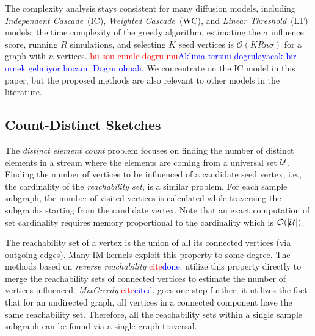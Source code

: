 \documentclass[10pt,journal,compsoc]{IEEEtran}
\newcommand\ggx[1]{\textcolor{blue}{#1}}
\newcommand\kktodo[1]{\textcolor{red}{#1}}
\begin{document}
The complexity analysis stays consistent for many diffusion models, including {\em Independent Cascade}~(IC), {\em Weighted Cascade}~(WC), and {\em Linear Threshold}~(LT)  models; the time complexity of the greedy algorithm, estimating the $\sigma$ influence score, running $R$ simulations, and selecting $K$ seed vertices is $\mathcal{O}(KRn\sigma)$ for a graph with $n$ vertices. \kktodo{bu son cumle dogru mu}\ggx{Aklima tersini dogrulayacak bir ornek gelmiyor hocam. Dogru olmali.} We concentrate on the IC model in this paper, but the proposed methods are also relevant to other models in the literature.

\subsection{Count-Distinct Sketches}\label{sec:sketch}
The {\em distinct element count} problem focuses on finding the number of distinct elements in a stream where the elements are coming from a universal set ${\cal U}$. Finding the number of vertices to be influenced of a candidate seed vertex, i.e., the cardinality of the {\em reachability set}, is a similar problem. For each sample subgraph, the number of visited vertices is calculated while traversing the subgraphs starting from the candidate vertex. Note that an exact computation of set cardinality requires memory proportional to the cardinality which is ${\mathcal O}(|{\cal U}|)$. 

The reachability set of a vertex is the union of all its connected vertices (via outgoing edges). Many IM kernels exploit this property to some degree. The methods based on {\em reverse reachability} \cite{borgs2014maximizing} \kktodo{cite}\ggx{done.} 
utilize this property directly to merge the reachability sets of connected vertices to estimate the number of vertices influenced. {\em MixGreedy} \cite{MixGreedy} \kktodo{cite}\ggx{cited.} goes one step further; it utilizes the fact that for an undirected graph, all vertices in a connected component have the same reachability set. Therefore, all the reachability sets within a single sample subgraph can be found via a single graph traversal. 
\end{document}
